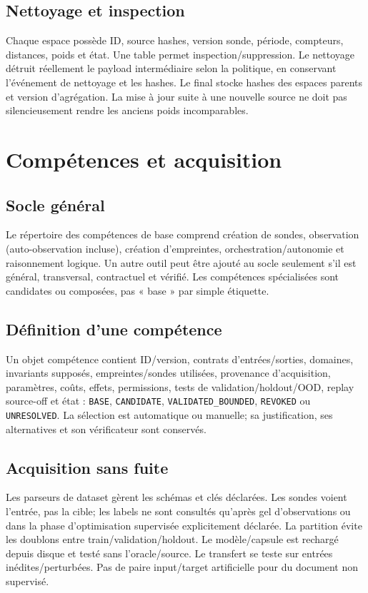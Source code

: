 \documentclass[11pt,a4paper]{report}
\begin{document}
\section{Nettoyage et inspection}Chaque espace possède ID, source hashes, version sonde, période, compteurs, distances, poids et état. Une table permet inspection/suppression. Le nettoyage détruit réellement le payload intermédiaire selon la politique, en conservant l'événement de nettoyage et les hashes. Le final stocke hashes des espaces parents et version d'agrégation. La mise à jour suite à une nouvelle source ne doit pas silencieusement rendre les anciens poids incomparables.

\chapter{Compétences et acquisition}
\section{Socle général}Le répertoire des compétences de base comprend création de sondes, observation (auto-observation incluse), création d'empreintes, orchestration/autonomie et raisonnement logique. Un autre outil peut être ajouté au socle seulement s'il est général, transversal, contractuel et vérifié. Les compétences spécialisées sont candidates ou composées, pas « base » par simple étiquette.
\section{Définition d'une compétence}Un objet compétence contient ID/version, contrats d'entrées/sorties, domaines, invariants supposés, empreintes/sondes utilisées, provenance d'acquisition, paramètres, coûts, effets, permissions, tests de validation/holdout/OOD, replay source-off et état : \texttt{BASE}, \texttt{CANDIDATE}, \texttt{VALIDATED\_BOUNDED}, \texttt{REVOKED} ou \texttt{UNRESOLVED}. La sélection est automatique ou manuelle; sa justification, ses alternatives et son vérificateur sont conservés.
\section{Acquisition sans fuite}Les parseurs de dataset gèrent les schémas et clés déclarées. Les sondes voient l'entrée, pas la cible; les labels ne sont consultés qu'après gel d'observations ou dans la phase d'optimisation supervisée explicitement déclarée. La partition évite les doublons entre train/validation/holdout. Le modèle/capsule est rechargé depuis disque et testé sans l'oracle/source. Le transfert se teste sur entrées inédites/perturbées. Pas de paire input/target artificielle pour du document non supervisé.
\end{document}
